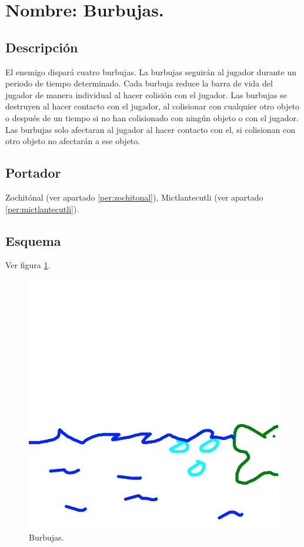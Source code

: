 \section{Nombre: Burbujas.}\label{hab.burbujas}
\subsection{Descripción}
El enemigo dispará cuatro burbujas. La burbujas seguirán al jugador durante un periodo de tiempo determinado. Cada burbuja reduce la barra de vida del jugador de manera individual al hacer colisión con el jugador. Las burbujas se destruyen al hacer contacto con el jugador, al colisionar con cualquier otro objeto o después de un tiempo si no han colisionado con ningún objeto o con el jugador. Las burbujas solo afectaran al jugador al hacer contacto con el, si colisionan con otro objeto no afectarán a ese objeto. 
\subsection{Portador}
Zochitónal (ver apartado \ref{per:zochitonal}),  Mictlantecutli (ver apartado \ref{per:mictlantecutli}).
\subsection{Esquema}
			Ver figura \ref{fig:burbujas}.
			\begin{figure}
				\centering
				\includegraphics[height=0.2 \textheight]{Imagenes/burbujas}
				\caption{Burbujas.}
				\label{fig:burbujas}
			\end{figure}
